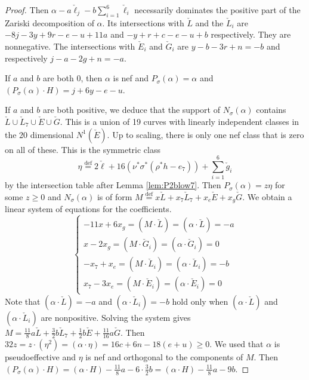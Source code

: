 \documentclass[12pt]{amsart}
\theoremstyle{definition}
\renewcommand{\geq}{\geqslant}
\newcommand{\deq}{\ensuremath{\stackrel{\textrm{def}}{=}}}
\newcommand{\?}{ \circled{{\large\bf ?}}}
\begin{document}
\begin{proof}
Then $\alpha-a\check{\ell}_j-b\sum_{i=1}^6\check{\ell}_i$ necessarily dominates the positive part of the Zariski decomposition of $\alpha$. Its intersections with $\check{L}$ and the $\check{L}_i$ are $-8j-3y+9r-e-u+11a$ and $-y+r+c-e-u+b$ respectively. They are nonnegative. The intersections with $\check E_i$ and $\check G_i$ are $y-b-3r+n=-b$ and respectively $j-a-2g+n=-a$.

If $a$ and $b$ are both 0, then $\alpha$ is nef and $P_{\sigma}(\alpha)=\alpha$ and $(P_{\sigma}(\alpha)\cdot H)=j+6y-e-u$.

If $a$ and $b$ are both positive, we deduce that the support of $N_{\sigma}(\alpha)$ contains $\check L\cup\check L_7\cup\check E\cup\check G$. This is a union of 19 curves with linearly independent classes in the 20 dimensional $N^1(\check E)$. Up to scaling, there is only one nef class that is zero on all of these. This is the symmetric class \[\eta\deq 2\check\ell+16(\nu^*\sigma^*(\rho^*h-e_7))+\sum_{i=1}^6\check g_i\] by the intersection table after Lemma \ref{lem:P2blow7}. Then $P_{\sigma}(\alpha)=z\eta$ for some $z\geq 0$ and $N_{\sigma}(\alpha)$ is of form $M\deq x\check L+x_7\check L_7+x_e\check E+x_g\check G$.
We obtain a linear system of equations for the coefficients. 
\[\begin{cases}
	-11x+6x_g=(M\cdot\check L)=(\alpha\cdot\check L)=-a\\
	x-2x_g=(M\cdot\check G_i)=(\alpha\cdot\check G_i)=0\\
	-x_7+x_e=(M\cdot\check L_i)=(\alpha\cdot\check L_i)=-b\\
	x_7-3x_e=(M\cdot \check E_i)=(\alpha\cdot\check E_i)=0
\end{cases}\]
Note that $(\alpha\cdot\check L)=-a$ and $(\alpha\cdot\check L_i)=-b$ hold only when $(\alpha\cdot\check L)$ and $(\alpha\cdot\check L_i)$ are nonpositive.
Solving the system gives $M=\frac{11}8a\check L+\frac 32b\check L_7+\frac 12b\check E+\frac{11}{16}a\check G$. 
Then $32z=z\cdotp(\eta^2)=(\alpha\cdot\eta)=16c+6n-18(e+u)\geq 0$. We used that $\alpha$ is pseudoeffective and $\eta$ is nef and orthogonal to the components of $M$. Then $(P_{\sigma}(\alpha)\cdot H)=(\alpha\cdot H)-\frac {11}8a-6\cdot\frac 32b=(\alpha\cdot H)-\frac{11}8a-9b$.


\end{proof}
\end{document}
